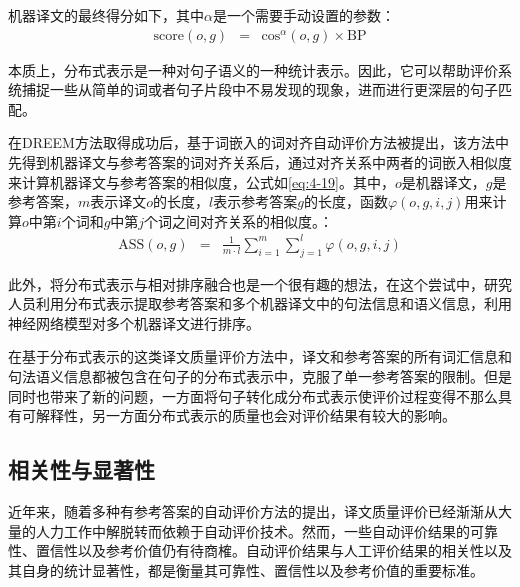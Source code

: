 \parinterval 机器译文的最终得分如下，其中$\alpha$是一个需要手动设置的参数：
\begin{eqnarray}
\textrm{score}(o,g) &=& \textrm{cos}{^\alpha }(o,g) \times \textrm{BP}
\label{eq:4-18}
\end{eqnarray}

\parinterval 本质上，分布式表示是一种对句子语义的一种统计表示。因此，它可以帮助评价系统捕捉一些从简单的词或者句子片段中不易发现的现象，进而进行更深层的句子匹配。

\parinterval 在DREEM方法取得成功后，基于词嵌入的词对齐自动评价方法被提出，该方法中先得到机器译文与参考答案的词对齐关系后，通过对齐关系中两者的词嵌入相似度来计算机器译文与参考答案的相似度，公式如\eqref{eq:4-19}。其中，$o$是机器译文，$g$是参考答案，$m$表示译文$o$的长度，$l$表示参考答案$g$的长度，函数$\varphi(o,g,i,j)$用来计算$o$中第$i$个词和$g$中第$j$个词之间对齐关系的相似度。：
\begin{eqnarray}
\textrm{ASS}(o,g) &=& \frac{1}{{m \cdot l}}\sum\limits_{i = 1}^{m} {\sum\limits_{j = 1}^{l} {\varphi (o,g,i,j)} }
\label{eq:4-19}
\end{eqnarray}

\parinterval 此外，将分布式表示与相对排序融合也是一个很有趣的想法，在这个尝试中，研究人员利用分布式表示提取参考答案和多个机器译文中的句法信息和语义信息，利用神经网络模型对多个机器译文进行排序。

\parinterval 在基于分布式表示的这类译文质量评价方法中，译文和参考答案的所有词汇信息和句法语义信息都被包含在句子的分布式表示中，克服了单一参考答案的限制。但是同时也带来了新的问题，一方面将句子转化成分布式表示使评价过程变得不那么具有可解释性，另一方面分布式表示的质量也会对评价结果有较大的影响。


\subsection{相关性与显著性}

\parinterval 近年来，随着多种有参考答案的自动评价方法的提出，译文质量评价已经渐渐从大量的人力工作中解脱转而依赖于自动评价技术。然而，一些自动评价结果的可靠性、置信性以及参考价值仍有待商榷。自动评价结果与人工评价结果的相关性以及其自身的统计显著性，都是衡量其可靠性、置信性以及参考价值的重要标准。


